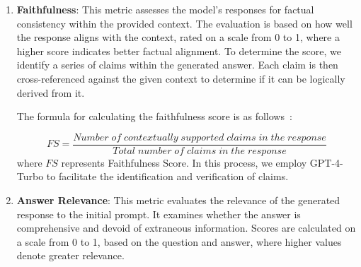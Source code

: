 \documentclass[runningheads]{llncs}
\begin{document}
\begin{enumerate}

    \item \textbf{Faithfulness}: 
    This metric assesses the model's responses for factual consistency within the provided context. The evaluation is based on how well the response aligns with the context, rated on a scale from 0 to 1, where a higher score indicates better factual alignment.
    To determine the score, we identify a series of claims within the generated answer. Each claim is then cross-referenced against the given context to determine if it can be logically derived from it.

    The formula for calculating the faithfulness score is as follows~\cite{es2023ragas,adams2023meta}: %


\[
    FS = \frac{Number\;of\;contextually\;supported\;claims\;in\;the\;response}{Total\;number\;of\;claims\;in\;the\;response}
\]
where $FS$ represents Faithfulness Score.
    In this process, we employ GPT-4-Turbo to facilitate the identification and verification of claims.

    
    \item \textbf{Answer Relevance}: This metric evaluates the relevance of the generated response to the initial prompt. It examines whether the answer is comprehensive and devoid of extraneous information. Scores are calculated on a scale from 0 to 1, based on the question and answer, where higher values denote greater relevance.


\end{enumerate}
\end{document}
